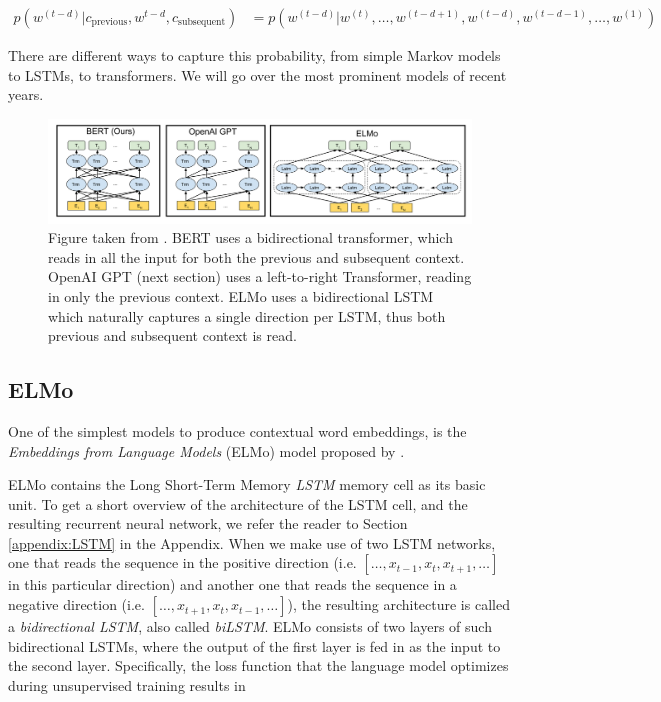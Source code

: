 \documentclass[a4paper,12pt,oneside,openright]{report}
\begin{document}
\begin{align}
p(w^{(t-d)} | c_\text{previous}, w^{t-d}, c_\text{subsequent}) &= p(w^{(t-d)} | w^{(t)}, \ldots, w^{(t-d + 1)}, w^{(t-d)}, w^{(t-d - 1)}, \ldots, w^{(1)})
\end{align}{\label{eq:transformer_probability}}

There are different ways to capture this probability, from simple Markov models to LSTMs, to transformers.
We will go over the most prominent models of recent years. \\

\begin{figure}[h]
	\center
  \includegraphics[width=\linewidth]{./assets/background/BERT_GPT_ELMo.png}
  \caption{Figure taken from \cite{devlin18}. BERT uses a bidirectional transformer, which reads in all the input for both the previous and subsequent context. OpenAI GPT (next section) uses a left-to-right Transformer, reading in only the previous context. ELMo uses a bidirectional LSTM which naturally captures a single direction per LSTM, thus both previous and subsequent context is read. }
  \label{fig:attention_is_all_you_need}
\end{figure}

\subsection{ELMo}

One of the simplest models to produce contextual word embeddings, is the \textit{Embeddings from Language Models} (ELMo) model proposed by \cite{peters17b}.

ELMo contains the Long Short-Term Memory \textit{LSTM} memory cell as its basic unit.
To get a short overview of the architecture of the LSTM cell, and the resulting recurrent neural network, we refer the reader to Section \ref{appendix:LSTM} in the Appendix.
When we make use of two LSTM networks, one that reads the sequence in the positive direction (i.e. $[\ldots, x_{t-1}, x_t, x_{t+1}, \ldots]$ in this particular direction) and another one that reads the sequence in a negative direction (i.e. $[\ldots, x_{t+1}, x_t, x_{t-1}, \ldots]$), the resulting architecture is called a \textit{bidirectional LSTM}, also called \textit{biLSTM}.
ELMo consists of two layers of such bidirectional LSTMs, where the output of the first layer is fed in as the input to the second layer.
Specifically, the loss function that the language model optimizes during unsupervised training results in 
\end{document}
